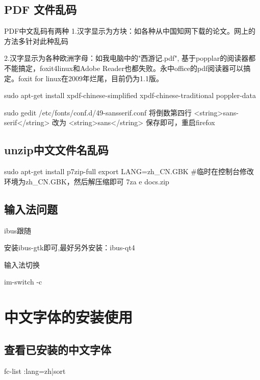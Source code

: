 \subsection{PDF 文件乱码}
PDF中文乱码有两种
1.汉字显示为方块：如各种从中国知网下载的论文。网上的方法多针对此种乱码

2.汉字显示为各种欧洲字母：如我电脑中的"西游记.pdf", 基于popplar的阅读器都不能搞定，foxit4linux和Adobe Reader也都失败。永中office的pdf阅读器可以搞定。foxit for linux在2009年烂尾，目前仍为1.1版。
\begin{shellcmd}
sudo apt-get install xpdf-chinese-simplified xpdf-chinese-traditional poppler-data
\end{shellcmd}

\begin{shellcmd}
sudo gedit /etc/fonts/conf.d/49-sansserif.conf 
将倒数第四行 <string>sans-serif</string>
改为 <string>sans</string>
保存即可，重启firefox
\end{shellcmd}

\subsection{unzip中文文件名乱码}
\begin{shellcmd}
sudo apt-get install p7zip-full
export LANG=zh_CN.GBK  #临时在控制台修改环境为zh_CN.GBK，然后解压缩即可
7za e docs.zip
\end{shellcmd}

\subsection{输入法问题}
ibus跟随
\begin{shellcmd}
安装ibus-gtk即可,最好另外安装：ibus-qt4
\end{shellcmd}
输入法切换
\begin{shellcmd}
im-switch -c
\end{shellcmd}









\section{中文字体的安装使用}
\subsection{查看已安装的中文字体}
\begin{shellcmd}
fc-list :lang=zh|sort
\end{shellcmd}

